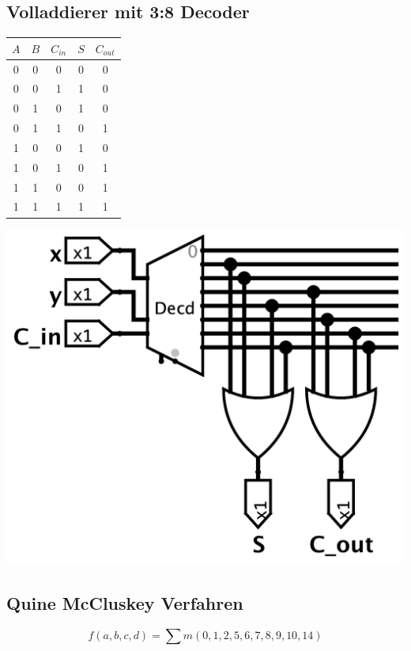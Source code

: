 \documentclass[a4paper,6pt]{article}
\begin{document}
\begin{multicols*}{3}
\subsection{Volladdierer mit 3:8 Decoder}
\tiny
\begin{center}
   \begin{tabular}{ccc|cc}
    \hline
    $A$ & $B$ & $C_{in}$ & $S$ & $C_{out}$ \\ \hline
    0 & 0 & 0   & 0 & 0    \\
    0 & 0 & 1   & 1 & 0    \\
    0 & 1 & 0   & 1 & 0    \\
    0 & 1 & 1   & 0 & 1    \\
    1 & 0 & 0   & 1 & 0    \\
    1 & 0 & 1   & 0 & 1    \\
    1 & 1 & 0   & 0 & 1    \\
    1 & 1 & 1   & 1 & 1    \\ \hline
    \end{tabular} 
\end{center}

\scriptsize

\begin{center}
    \includegraphics[width=0.75\linewidth]{resources/Decoder_Full_Adder.png}
\end{center}
    

\subsection{Quine McCluskey Verfahren}
\small
$$
f(a,b,c,d) = \sum m(0,1,2,5,6,7,8,9,10,14)
$$
\scriptsize


\end{multicols*}
\end{document}
